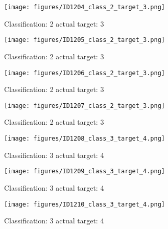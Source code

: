 \begin{figure}[h!]
\begin{center}
\texttt{[image: figures/ID1204\_class\_2\_target\_3.png]}
\end{center}
\caption{ Classification: 2 actual target: 3}
\label{fig:ID1204_class_2_target_3}
\end{figure}
\begin{figure}[h!]
\begin{center}
\texttt{[image: figures/ID1205\_class\_2\_target\_3.png]}
\end{center}
\caption{ Classification: 2 actual target: 3}
\label{fig:ID1205_class_2_target_3}
\end{figure}
\begin{figure}[h!]
\begin{center}
\texttt{[image: figures/ID1206\_class\_2\_target\_3.png]}
\end{center}
\caption{ Classification: 2 actual target: 3}
\label{fig:ID1206_class_2_target_3}
\end{figure}
\begin{figure}[h!]
\begin{center}
\texttt{[image: figures/ID1207\_class\_2\_target\_3.png]}
\end{center}
\caption{ Classification: 2 actual target: 3}
\label{fig:ID1207_class_2_target_3}
\end{figure}
\begin{figure}[h!]
\begin{center}
\texttt{[image: figures/ID1208\_class\_3\_target\_4.png]}
\end{center}
\caption{ Classification: 3 actual target: 4}
\label{fig:ID1208_class_3_target_4}
\end{figure}
\begin{figure}[h!]
\begin{center}
\texttt{[image: figures/ID1209\_class\_3\_target\_4.png]}
\end{center}
\caption{ Classification: 3 actual target: 4}
\label{fig:ID1209_class_3_target_4}
\end{figure}
\begin{figure}[h!]
\begin{center}
\texttt{[image: figures/ID1210\_class\_3\_target\_4.png]}
\end{center}
\caption{ Classification: 3 actual target: 4}
\label{fig:ID1210_class_3_target_4}
\end{figure}
